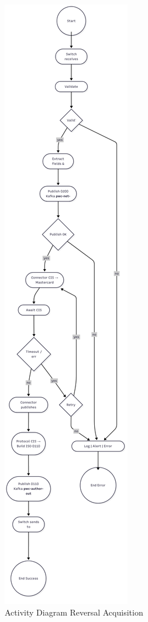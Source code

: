 \documentclass[12pt,a4paper]{report}
\begin{document}
\begin{figure}[H]
\centering
\includegraphics[width=\textwidth,height=0.85\textheight,keepaspectratio]{media/acq-rev-auth-req.png}
\caption{Activity Diagram Reversal Acquisition}
\label{fig:ADRA}
\end{figure}
\clearpage
\end{document}
